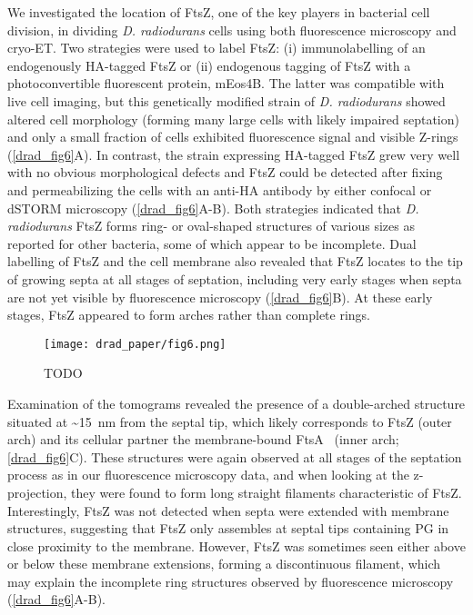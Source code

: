 We investigated the location of FtsZ, one of the key players in bacterial cell division, in dividing \textit{D. radiodurans} cells using both fluorescence microscopy and cryo-ET.
Two strategies were used to label FtsZ: (i) immunolabelling of an endogenously HA-tagged FtsZ or (ii) endogenous tagging of FtsZ with a photoconvertible fluorescent protein, mEos4B.
The latter was compatible with live cell imaging, but this genetically modified strain of \textit{D. radiodurans} showed altered cell morphology (forming many large cells with likely impaired septation) and only a small fraction of cells exhibited fluorescence signal and visible Z-rings (\autoref{drad_fig6}A).
In contrast, the strain expressing HA-tagged FtsZ grew very well with no obvious morphological defects and FtsZ could be detected after fixing and permeabilizing the cells with an anti-HA antibody by either confocal or dSTORM microscopy (\autoref{drad_fig6}A-B).
Both strategies indicated that \textit{D. radiodurans} FtsZ forms ring- or oval-shaped structures of various sizes as reported for other bacteria, some of which appear to be incomplete.
Dual labelling of FtsZ and the cell membrane also revealed that FtsZ locates to the tip of growing septa at all stages of septation, including very early stages when septa are not yet visible by fluorescence microscopy (\autoref{drad_fig6}B).
At these early stages, FtsZ appeared to form arches rather than complete rings.

\begin{figure}[ht]
    \centering
    \texttt{[image: drad\_paper/fig6.png]}
    \caption{TODO}
    \label{drad_fig6}
\end{figure}

Examination of the tomograms revealed the presence of a double-arched structure situated at \sim\qty{15}{nm} from the septal tip, which likely corresponds to FtsZ (outer arch) and its cellular partner the membrane-bound FtsA~\cite{sextonSuperresolutionConfocalCryoCLEM2022} (inner arch; \autoref{drad_fig6}C).
These structures were again observed at all stages of the septation process as in our fluorescence microscopy data, and when looking at the z-projection, they were found to form long straight filaments characteristic of FtsZ.
Interestingly, FtsZ was not detected when septa were extended with membrane structures, suggesting that FtsZ only assembles at septal tips containing PG in close proximity to the membrane.
However, FtsZ was sometimes seen either above or below these membrane extensions, forming a discontinuous filament, which may explain the incomplete ring structures observed by fluorescence microscopy (\autoref{drad_fig6}A-B).

